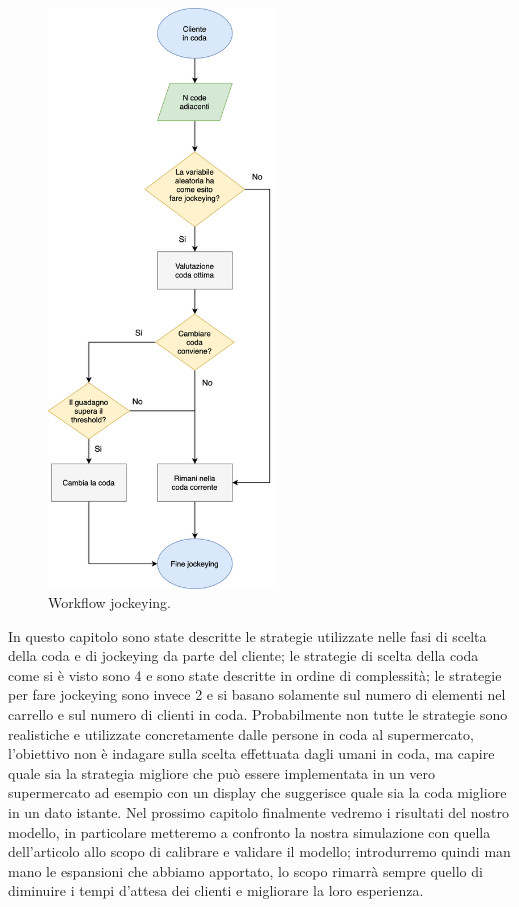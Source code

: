 \begin{figure}[htp!]
	\centering
	\includegraphics[width=6cm]{"images/jockeying-flowchart.png"}
	\caption{Workflow jockeying.}
	\label{fig:jockeying-flowchart}
\end{figure}

\vspace*{1\baselineskip}

In questo capitolo sono state descritte le strategie utilizzate nelle fasi di scelta della coda e di jockeying da parte del cliente; le strategie di scelta della coda come si è visto sono 4 e sono state descritte in ordine di complessità; le strategie per fare jockeying sono invece 2 e si basano solamente sul numero di elementi nel carrello e sul numero di clienti in coda. Probabilmente non tutte le strategie sono realistiche e utilizzate concretamente dalle persone in coda al supermercato, l'obiettivo non è indagare sulla scelta effettuata dagli umani in coda, ma capire quale sia la strategia migliore che può essere implementata in un vero supermercato ad esempio con un display che suggerisce quale sia la coda migliore in un dato istante. Nel prossimo capitolo finalmente vedremo i risultati del nostro modello, in particolare metteremo a confronto la nostra simulazione con quella dell'articolo \cite{article1} allo scopo di calibrare e validare il modello; introdurremo quindi man mano le espansioni che abbiamo apportato, lo scopo rimarrà sempre quello di diminuire i tempi d'attesa dei clienti e migliorare la loro esperienza.
